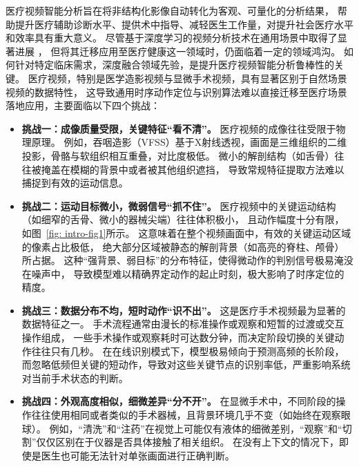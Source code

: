 医疗视频智能分析旨在将非结构化影像自动转化为客观、可量化的分析结果，
帮助提升医疗辅助诊断水平、提供术中指导、减轻医生工作量，对提升社会医疗水平和效率具有重大意义。
尽管基于深度学习的视频分析技术在通用场景中取得了显著进展
\cite{zeng2019graph,yang2020revisiting,zhang2022actionformer,shi2023tridet,yang2024adapting,li2025videomamba}，
但将其迁移应用至医疗健康这一领域时，仍面临着一定的领域鸿沟。
如何针对特定临床需求，深度融合领域先验，是提升医疗视频智能分析鲁棒性的关键。
医疗视频，特别是医学造影视频与显微手术视频，具有显著区别于自然场景视频的数据特性，
这导致通用时序动作定位与识别算法难以直接迁移至医疗场景落地应用，主要面临以下四个挑战：
\begin{itemize}
    \item \textbf{挑战一：成像质量受限，关键特征“看不清”。}
    医疗视频的成像往往受限于物理原理。
    例如，吞咽造影（VFSS）基于X射线透视，画面是三维组织的二维投影，骨骼与软组织相互重叠，对比度极低。
    微小的解剖结构（如舌骨）往往被掩盖在模糊的背景中或者被其他组织遮挡，
    导致常规特征提取方法难以捕捉到有效的运动信息。

    \item \textbf{挑战二：运动目标微小，微弱信号“抓不住”。}
    医疗视频中的关键运动结构（如细窄的舌骨、微小的器械尖端）往往体积极小，
    且动作幅度十分有限，如图~\ref{fig: intro-fig1}所示。
    这意味着在整个视频画面中，有效的关键运动区域的像素占比极低，
    绝大部分区域被静态的解剖背景（如高亮的脊柱、颅骨）所占据。
    这种“强背景、弱目标”的分布特征，使得微动作的判别信号极易淹没在噪声中，
    导致模型难以精确界定动作的起止时刻，极大影响了时序定位的精度。

    \item \textbf{挑战三：数据分布不均，短时动作“识不出”。}
    这是医疗手术视频最为显著的数据特征之一。
    手术流程通常由漫长的标准操作或观察和短暂的过渡或交互操作组成，
    一些手术操作或观察耗时可达数分钟，而决定阶段切换的关键动作往往只有几秒。
    在在线识别模式下，模型极易倾向于预测高频的长阶段，
    而忽略低频但关键的短动作，导致对这些关键节点的识别率低，严重影响系统对当前手术状态的判断。

    \item \textbf{挑战四：外观高度相似，细微差异“分不开”。}
    在显微手术中，不同阶段的操作往往使用相同或者类似的手术器械，且背景环境几乎不变（如始终在观察眼球）。
    例如，“清洗”和“注药”在视觉上可能仅有液体的细微差别，“观察”和“切割”仅仅区别在于仪器是否具体接触了相关组织。
    在没有上下文的情况下，即使是医生也可能无法针对单张画面进行正确判断。
\end{itemize}

